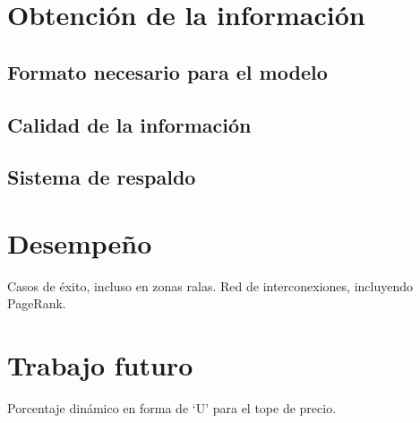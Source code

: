 \documentclass[12pt]{report}
\begin{document}
\chapter{Obtención de la información}
\section{Formato necesario para el modelo}
\section{Calidad de la información}
\section{Sistema de respaldo}

\chapter{Desempeño}
Casos de éxito, incluso en zonas ralas.
Red de interconexiones, incluyendo PageRank.

\chapter{Trabajo futuro}
Porcentaje dinámico en forma de `U' para el tope de precio.

 
 
\end{document}
